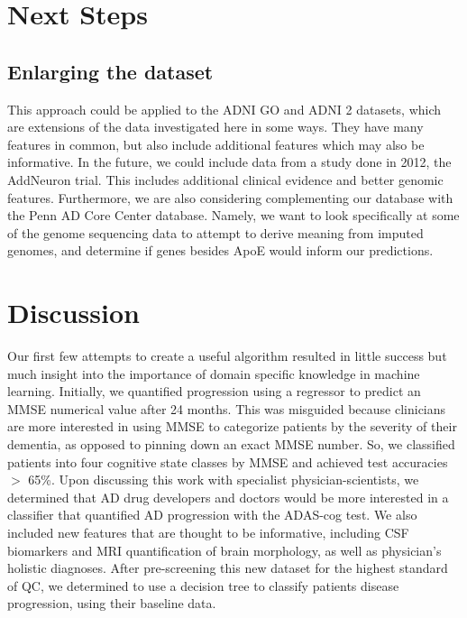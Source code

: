 \documentclass{article}
\begin{document}
\section{Next Steps}
\subsection*{Enlarging the dataset}
This approach could be applied to the ADNI GO and ADNI 2 datasets, which are extensions of the data investigated here in some ways. They have many features in common, but also include additional features which may also be informative. In the future, we could include data from a study done in 2012, the AddNeuron trial. This includes additional clinical evidence and better genomic features. Furthermore, we are also considering complementing our database with the Penn AD Core Center database. Namely, we want to look specifically at some of the genome sequencing data to attempt to derive meaning from imputed genomes, and determine if genes besides ApoE would inform our predictions.

\section{Discussion}
Our first few attempts to create a useful algorithm resulted in little success but much insight into the importance of domain specific knowledge in machine learning. Initially, we quantified progression using a regressor to predict an MMSE numerical value after 24 months. This was misguided because clinicians are more interested in using MMSE to categorize patients by the severity of their dementia, as opposed to pinning down an exact MMSE number. So, we classified patients into four cognitive state classes by MMSE and achieved test accuracies $>$ 65\%. Upon discussing this work with specialist physician-scientists, we determined that AD drug developers and doctors would be more interested in a classifier that quantified AD progression with the ADAS-cog test. We also included new features that are thought to be informative, including CSF biomarkers and MRI quantification of brain morphology, as well as physician's holistic diagnoses. After pre-screening this new dataset for the highest standard of QC, we determined to use a decision tree to classify patients disease progression, using their baseline data.
\end{document}
